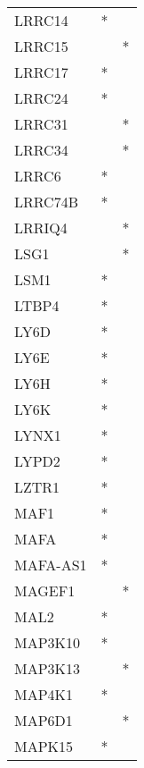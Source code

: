 \begin{longtable}{lcc}
LRRC14           &              * &            \\
LRRC15           &                &          * \\
LRRC17           &              * &            \\
LRRC24           &              * &            \\
LRRC31           &                &          * \\
LRRC34           &                &          * \\
LRRC6            &              * &            \\
LRRC74B          &              * &            \\
LRRIQ4           &                &          * \\
LSG1             &                &          * \\
LSM1             &              * &            \\
LTBP4            &              * &            \\
LY6D             &              * &            \\
LY6E             &              * &            \\
LY6H             &              * &            \\
LY6K             &              * &            \\
LYNX1            &              * &            \\
LYPD2            &              * &            \\
LZTR1            &              * &            \\
MAF1             &              * &            \\
MAFA             &              * &            \\
MAFA-AS1         &              * &            \\
MAGEF1           &                &          * \\
MAL2             &              * &            \\
MAP3K10          &              * &            \\
MAP3K13          &                &          * \\
MAP4K1           &              * &            \\
MAP6D1           &                &          * \\
MAPK15           &              * &            \\

\end{longtable}
